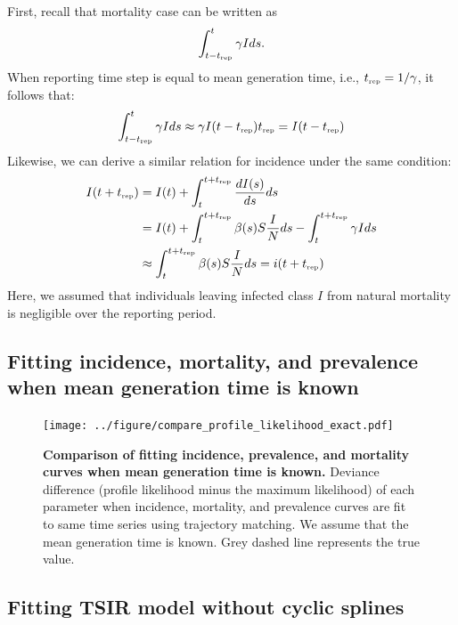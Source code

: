 \documentclass{article}
\newcommand{\tsub}[2]{#1_{{\textrm{\tiny #2}}}}
\begin{document}
First, recall that mortality case can be written as
\begin{equation}
\int_{t-\tsub{t}{rep}}^{t} \gamma I ds.
\end{equation}
When reporting time step is equal to mean generation time, i.e., $\tsub{t}{rep} = 1/\gamma$, 
it follows that:
\begin{equation}
\int_{t-\tsub{t}{rep}}^{t} \gamma I ds \approx \gamma I(t-\tsub{t}{rep}) \tsub{t}{rep} = I(t-\tsub{t}{rep})
\end{equation}
Likewise, we can derive a similar relation for incidence under the same condition:
\begin{equation}
\begin{aligned}
I(t+\tsub{t}{rep}) &= I(t) + \int_{t}^{t+\tsub{t}{rep}} \frac{dI(s)}{ds} ds\\
&= I(t) + \int_{t}^{t+\tsub{t}{rep}} \beta(s) S \frac{I}{N} ds - \int_{t}^{t+\tsub{t}{rep}} \gamma I ds\\
&\approx \int_{t}^{t+\tsub{t}{rep}} \beta(s) S \frac{I}{N} ds = i(t + \tsub{t}{rep})
\end{aligned}
\end{equation}
Here, we assumed that individuals leaving infected class $I$ from natural mortality is negligible over the reporting period.

\pagebreak
\subsection{Fitting incidence, mortality, and prevalence when mean generation time is known}

\begin{figure}[!h]
\texttt{[image: ../figure/compare\_profile\_likelihood\_exact.pdf]}
\caption{
\textbf{Comparison of fitting incidence, prevalence, and mortality curves when mean generation time is known.}
Deviance difference (profile likelihood minus the maximum likelihood) of each
parameter when incidence, mortality, and prevalence curves are fit to same time series
using trajectory matching. 
We assume that the mean generation time is known.
Grey dashed line represents the true value.
}
\end{figure}

\pagebreak
\subsection{Fitting TSIR model without cyclic splines}
\end{document}
